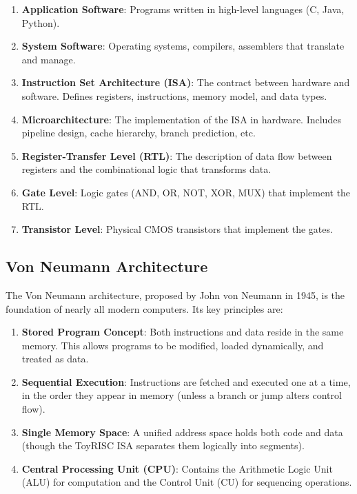 \documentclass[12pt,a4paper]{article}
\begin{document}
\begin{enumerate}
    \item \textbf{Application Software}: Programs written in high-level languages (C, Java, Python).
    \item \textbf{System Software}: Operating systems, compilers, assemblers that translate and manage.
    \item \textbf{Instruction Set Architecture (ISA)}: The contract between hardware and software. Defines registers, instructions, memory model, and data types.
    \item \textbf{Microarchitecture}: The implementation of the ISA in hardware. Includes pipeline design, cache hierarchy, branch prediction, etc.
    \item \textbf{Register-Transfer Level (RTL)}: The description of data flow between registers and the combinational logic that transforms data.
    \item \textbf{Gate Level}: Logic gates (AND, OR, NOT, XOR, MUX) that implement the RTL.
    \item \textbf{Transistor Level}: Physical CMOS transistors that implement the gates.
\end{enumerate}

\subsection{Von Neumann Architecture}

The Von Neumann architecture, proposed by John von Neumann in 1945, is the foundation of nearly all modern computers. Its key principles are:

\begin{enumerate}
    \item \textbf{Stored Program Concept}: Both instructions and data reside in the same memory. This allows programs to be modified, loaded dynamically, and treated as data.
    \item \textbf{Sequential Execution}: Instructions are fetched and executed one at a time, in the order they appear in memory (unless a branch or jump alters control flow).
    \item \textbf{Single Memory Space}: A unified address space holds both code and data (though the ToyRISC ISA separates them logically into segments).
    \item \textbf{Central Processing Unit (CPU)}: Contains the Arithmetic Logic Unit (ALU) for computation and the Control Unit (CU) for sequencing operations.
\end{enumerate}
\end{document}
